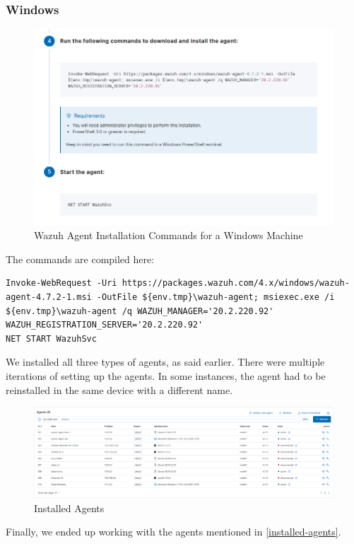 \begin{itemize}
    \subsubsection{Windows}
    \begin{figure}[H]
      \centering
      \includegraphics[width=\textwidth]{images/setup/wazuh-agent-commands-win.png}
      \caption{Wazuh Agent Installation Commands for a Windows Machine}
    \end{figure}
    The commands are compiled here:
    \begin{verbatim}
Invoke-WebRequest -Uri https://packages.wazuh.com/4.x/windows/wazuh-agent-4.7.2-1.msi -OutFile ${env.tmp}\wazuh-agent; msiexec.exe /i ${env.tmp}\wazuh-agent /q WAZUH_MANAGER='20.2.220.92' WAZUH_REGISTRATION_SERVER='20.2.220.92' 
NET START WazuhSvc
    \end{verbatim}
\end{itemize}

We installed all three types of agents, as said earlier. There were multiple iterations of setting up the agents. In some instances, the agent had to be reinstalled in the same device with a different name.
\begin{figure}[H]
    \centering
    \includegraphics[width=\textwidth]{images/setup/all-agents.png}
    \caption{Installed Agents}
    \label{fig:installed-agents}
\end{figure}

Finally, we ended up working with the agents mentioned in \ref{installed-agents}.